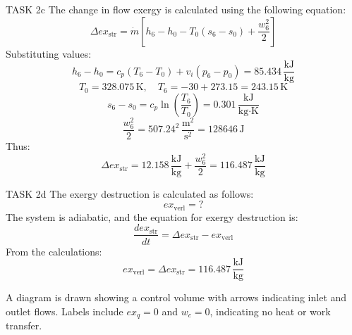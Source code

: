TASK 2c  
The change in flow exergy is calculated using the following equation:  
\[
\Delta ex_{\text{str}} = \dot{m} \left[ h_6 - h_0 - T_0 (s_6 - s_0) + \frac{w_6^2}{2} \right]
\]  
Substituting values:  
\[
h_6 - h_0 = c_p (T_6 - T_0) + v_i (p_6 - p_0) = 85.434 \, \frac{\text{kJ}}{\text{kg}}
\]  
\[
T_0 = 328.075 \, \text{K}, \quad T_6 = -30 + 273.15 = 243.15 \, \text{K}
\]  
\[
s_6 - s_0 = c_p \ln \left( \frac{T_6}{T_0} \right) = 0.301 \, \frac{\text{kJ}}{\text{kg·K}}
\]  
\[
\frac{w_6^2}{2} = 507.24^2 \, \frac{\text{m}^2}{\text{s}^2} = 128646 \, \text{J}
\]  
Thus:  
\[
\Delta ex_{\text{str}} = 12.158 \, \frac{\text{kJ}}{\text{kg}} + \frac{w_6^2}{2} = 116.487 \, \frac{\text{kJ}}{\text{kg}}
\]  

TASK 2d  
The exergy destruction is calculated as follows:  
\[
ex_{\text{verl}} = ?
\]  
The system is adiabatic, and the equation for exergy destruction is:  
\[
\frac{d ex_{\text{str}}}{dt} = \Delta ex_{\text{str}} - ex_{\text{verl}}
\]  
From the calculations:  
\[
ex_{\text{verl}} = \Delta ex_{\text{str}} = 116.487 \, \frac{\text{kJ}}{\text{kg}}
\]  

A diagram is drawn showing a control volume with arrows indicating inlet and outlet flows. Labels include \( ex_q = 0 \) and \( w_c = 0 \), indicating no heat or work transfer.